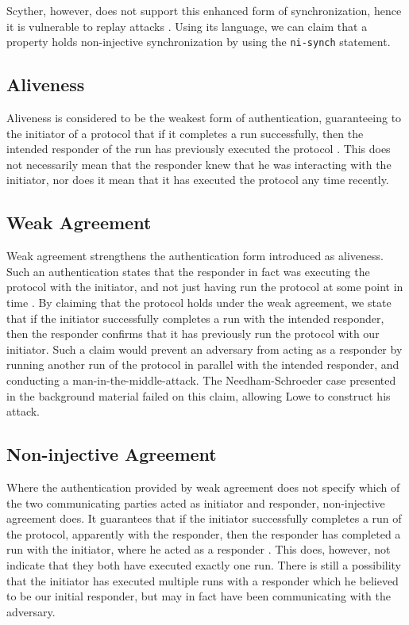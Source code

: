 Scyther, however, does not support this enhanced form of synchronization, hence it is vulnerable to replay attacks \cite{cremers2008scyther}. Using its language, we can claim that a property holds non-injective synchronization by using the \texttt{ni-synch} statement.



\subsection{Aliveness}

Aliveness is considered to be the weakest form of authentication, guaranteeing to the initiator of a protocol that if it completes a run successfully, then the intended responder of the run has previously executed the protocol \cite{lowe1997hierarchy}. This does not necessarily mean that the responder knew that he was interacting with the initiator, nor does it mean that it has executed the protocol any time recently. 


\subsection{Weak Agreement}

Weak agreement strengthens the authentication form introduced as aliveness. Such an authentication states that the responder in fact was executing the protocol with the initiator, and not just having run the protocol at some point in time \cite{lowe1997hierarchy}. By claiming that the protocol holds under the weak agreement, we state that if the initiator successfully completes a run with the intended responder, then the responder confirms that it has previously run the protocol with our initiator. Such a claim would prevent an adversary from acting as a responder by running another run of the protocol in parallel with the intended responder, and conducting a man-in-the-middle-attack. The Needham-Schroeder case presented in the background material failed on this claim, allowing Lowe to construct his attack. 


\subsection{Non-injective Agreement}

Where the authentication provided by weak agreement does not specify which of the two communicating parties acted as initiator and responder, non-injective agreement does. It guarantees that if the initiator successfully completes a run of the protocol, apparently with the responder, then the responder has completed a run with the initiator, where he acted as a responder \cite{lowe1997hierarchy}. This does, however, not indicate that they both have executed exactly one run. There is still a possibility that the initiator has executed multiple runs with a responder which he believed to be our initial responder, but may in fact have been communicating with the adversary.



